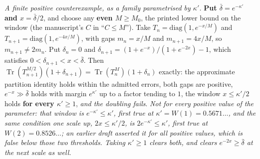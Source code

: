 \documentclass[11pt]{article}
\begin{document}
\emph{A finite positive counterexample, as a family parametrised by $\kappa'$.}
\textbf{Put $\bar\delta=e^{-\kappa'}$ and $x=\bar\delta/2$}, and choose any
\textbf{even $M\ge M_0$}, the printed lower bound on the window (the manuscript's
$C$ in ``$C\le M$''). Take
$T_n=\mathrm{diag}(1,e^{-x/M})$ and $T_{n+1}=\mathrm{diag}(1,e^{-4x/M})$, with gaps
$m_n=x/M$ and $m_{n+1}=4x/M$, so $m_{n+1}\neq2m_n$. Put $\delta_n=0$ and
$\delta_{n+1}=(1+e^{-x})/(1+e^{-2x})-1$, which satisfies
$0<\delta_{n+1}<x<\bar\delta$. Then
$\operatorname{Tr}(T_{n+1}^{M/2})(1+\delta_{n+1})
=\operatorname{Tr}(T_{n}^{M})(1+\delta_n)$ exactly: the approximate partition
identity holds within the admitted errors, both gaps are positive, $e^{-x}\gg
\bar\delta$ holds with margin $e^{\kappa'}$ up to a factor tending to $1$, the window
$x\le\kappa'/2$ holds \textbf{for every $\kappa'\ge1$}, \emph{and the doubling
fails}.
\emph{Not for every positive value of the parameter: that window is
$e^{-\kappa'}\le\kappa'$, first true at $\kappa'=W(1)=0.5671\ldots$, and the same
condition one scale up, $2x\le\kappa'/2$, is $2e^{-\kappa'}\le\kappa'$, first true at
$W(2)=0.8526\ldots$; an earlier draft asserted it for all positive values, which is
false below those two thresholds. Taking $\kappa'\ge1$ clears both, and clears
$e^{-2x}\ge\bar\delta$ at the next scale as well.}
\end{document}
